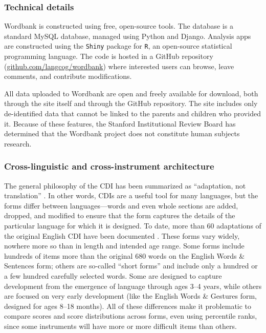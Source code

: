 \documentclass[man,noapacite]{apa}
\begin{document}
\subsubsection{Technical details}

Wordbank is constructed using free, open-source tools. The database is a standard MySQL database, managed using Python and Django. Analysis apps are constructed using the \texttt{Shiny} package for \texttt{R}, an open-source statistical programming language.  The code is hosted in a GitHub repository (\url{github.com/langcog/wordbank}) where interested users can browse, leave comments, and contribute modifications. 

All data uploaded to Wordbank are open and freely available for download, both through the site itself and through the GitHub repository. The site includes only de-identified data that cannot be linked to the parents and children who provided it. Because of these features, the Stanford Institutional Review Board has determined that the Wordbank project does not constitute human subjects research.

\subsubsection{Cross-linguistic and cross-instrument architecture}

The general philosophy of the CDI has been summarized as ``adaptation, not translation'' \cite{dale2015}. In other words, CDIs are a useful tool for many languages, but the forms differ between languages---words and even whole sections are added, dropped, and modified to ensure that the form captures the details of the particular language for which it is designed. To date, more than 60 adaptations of the original English CDI have been documented \cite{dale2011}. These forms vary widely, nowhere more so than in length and intended age range. Some forms include hundreds of items more than the original 680 words on the English Words \& Sentences form; others are so-called ``short forms'' and include only a hundred or a few hundred carefully selected words. Some are designed to capture development from the emergence of language through ages 3--4 years, while others are focused on very early development (like the English Words \& Gestures form, designed for ages 8--18 months). All of these differences make it problematic to compare scores and score distributions across forms, even using percentile ranks, since some instruments will have more or more difficult items than others. 
\end{document}
